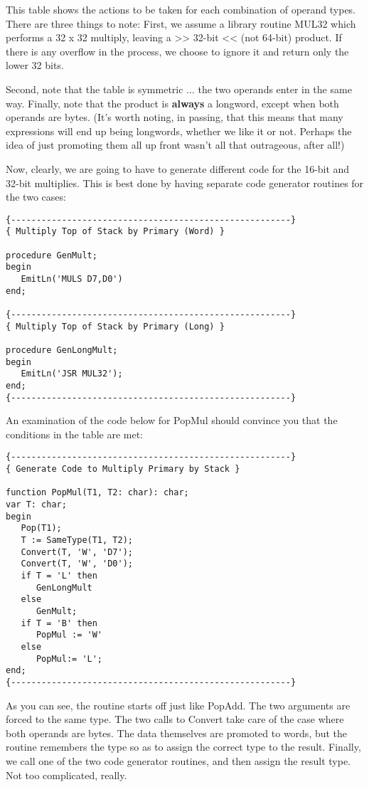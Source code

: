 This table shows the actions to be taken for each  combination of operand types. There are three things to note: First, we assume a library routine  MUL32  which  performs  a  32  x  32 multiply, leaving a >> 32-bit << (not 64-bit) product. If  there  is any overflow in the process, we  choose to ignore it and return only the lower 32 bits.

Second, note that the  table  is  symmetric  ... the two operands enter in the same way. Finally, note that the product  is {\bfseries always} a longword, except when  both  operands  are  bytes. (It's worth noting, in passing, that  this  means  that many expressions will end up being longwords, whether we  like  it or not. Perhaps the idea  of  just  promoting  them  all  up  front wasn't  all  that outrageous, after all!)

Now, clearly, we are going to have to generate different code for the 16-bit and 32-bit multiplies. This is best  done  by  having separate code generator routines for the two cases:

\begin{verbatim}
{-------------------------------------------------------}
{ Multiply Top of Stack by Primary (Word) }

procedure GenMult;
begin
   EmitLn('MULS D7,D0')
end;

{-------------------------------------------------------}
{ Multiply Top of Stack by Primary (Long) }

procedure GenLongMult;
begin
   EmitLn('JSR MUL32');
end;
{-------------------------------------------------------}
\end{verbatim}

An examination of the code below for PopMul  should  convince you that the conditions in the table are met:

\begin{verbatim}
{-------------------------------------------------------}
{ Generate Code to Multiply Primary by Stack }

function PopMul(T1, T2: char): char;
var T: char;
begin
   Pop(T1);
   T := SameType(T1, T2);
   Convert(T, 'W', 'D7');
   Convert(T, 'W', 'D0');
   if T = 'L' then
      GenLongMult
   else
      GenMult;
   if T = 'B' then
      PopMul := 'W'
   else
      PopMul:= 'L';
end;
{-------------------------------------------------------}
\end{verbatim}

As you can see, the routine starts off just like PopAdd. The two arguments are forced to the same type. The two calls  to Convert take  care  of  the case where both operands are bytes. The data themselves are promoted  to  words, but the routine remembers the type so as to assign the correct type to the result. Finally, we call one of the two code generator routines, and then  assign the result type. Not too complicated, really.

